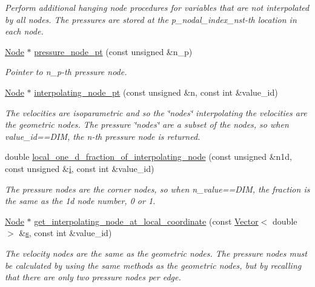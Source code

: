 \begin{DoxyCompactItemize}
\begin{DoxyCompactList}\small\item\em Perform additional hanging node procedures for variables that are not interpolated by all nodes. The pressures are stored at the p\+\_\+nodal\+\_\+index\+\_\+nst-\/th location in each node. \end{DoxyCompactList}\item 
\hyperlink{classoomph_1_1Node}{Node} $\ast$ \hyperlink{classoomph_1_1RefineableQTaylorHoodElement_a03c79a396ff4d0bb7c8537fd92abb211}{pressure\+\_\+node\+\_\+pt} (const unsigned \&n\+\_\+p)
\begin{DoxyCompactList}\small\item\em Pointer to n\+\_\+p-\/th pressure node. \end{DoxyCompactList}\item 
\hyperlink{classoomph_1_1Node}{Node} $\ast$ \hyperlink{classoomph_1_1RefineableQTaylorHoodElement_a98cdc0f229459c09186a70731cd973d1}{interpolating\+\_\+node\+\_\+pt} (const unsigned \&n, const int \&value\+\_\+id)
\begin{DoxyCompactList}\small\item\em The velocities are isoparametric and so the \char`\"{}nodes\char`\"{} interpolating the velocities are the geometric nodes. The pressure \char`\"{}nodes\char`\"{} are a subset of the nodes, so when value\+\_\+id==D\+IM, the n-\/th pressure node is returned. \end{DoxyCompactList}\item 
double \hyperlink{classoomph_1_1RefineableQTaylorHoodElement_a9983c7e51e0968b7627f5c25eb836f18}{local\+\_\+one\+\_\+d\+\_\+fraction\+\_\+of\+\_\+interpolating\+\_\+node} (const unsigned \&n1d, const unsigned \&\hyperlink{cfortran_8h_adb50e893b86b3e55e751a42eab3cba82}{i}, const int \&value\+\_\+id)
\begin{DoxyCompactList}\small\item\em The pressure nodes are the corner nodes, so when n\+\_\+value==D\+IM, the fraction is the same as the 1d node number, 0 or 1. \end{DoxyCompactList}\item 
\hyperlink{classoomph_1_1Node}{Node} $\ast$ \hyperlink{classoomph_1_1RefineableQTaylorHoodElement_abc2fe9fc2b519cbe96d2be48fe092db0}{get\+\_\+interpolating\+\_\+node\+\_\+at\+\_\+local\+\_\+coordinate} (const \hyperlink{classoomph_1_1Vector}{Vector}$<$ double $>$ \&\hyperlink{cfortran_8h_ab7123126e4885ef647dd9c6e3807a21c}{s}, const int \&value\+\_\+id)
\begin{DoxyCompactList}\small\item\em The velocity nodes are the same as the geometric nodes. The pressure nodes must be calculated by using the same methods as the geometric nodes, but by recalling that there are only two pressure nodes per edge. \end{DoxyCompactList}\item 

\end{DoxyCompactItemize}
